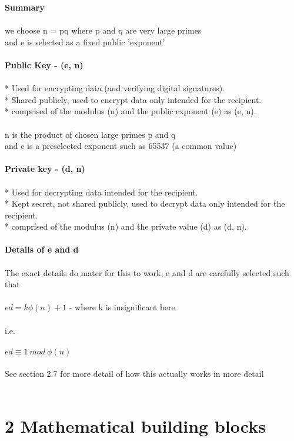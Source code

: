 \documentclass[11pt]{article}   	%
\begin{document}
\textbf{Summary} \\
\\
we choose n = pq where p and q are very large primes \\
and e is selected as a fixed public 'exponent' \\
\\
\textbf{Public Key - (e, n)} \\
\\
    * Used for encrypting data (and verifying digital signatures). \\
    * Shared publicly, used to encrypt data only intended for the recipient. \\
    * comprised of the modulus (n) and the public exponent (e) as (e, n). \\
\\
n is the product of chosen large primes p and q \\
and e is a preselected exponent such as 65537 (a common value) \\
\\
\textbf{Private key - (d, n)} \\
\\
    * Used for decrypting data intended for the recipient. \\
    * Kept secret, not shared publicly, used to decrypt data only intended for the recipient. \\
    * comprised of the modulus (n) and the private value (d) as (d, n). \\
\\
\textbf{Details of e and d} \\
\\
The exact details do mater for this to work, e and d are carefully selected such that \\
\\
$ ed = k\phi(n) + 1 $ - where k is insignificant here \\
\\
i.e. \\
\\
$ ed \equiv 1 \  mod \ \phi(n) $ \\
\\
See section 2.7 for more detail of how this actually works in more detail \\
\\

\break 


\section*{2 Mathematical building blocks}
\end{document}
